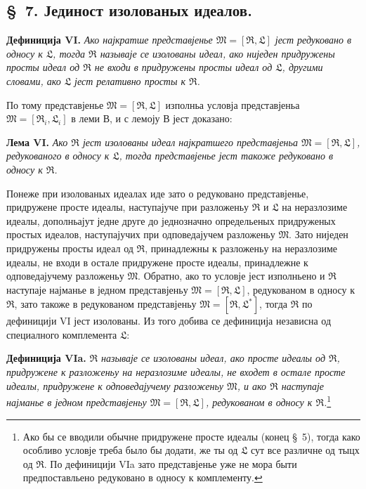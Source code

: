 ﻿\documentclass[11pt]{article}
\newcommand{\ideal}[1]{\mathfrak{#1}}
\begin{document}

\setcounter{footnote}{28}
\subsection*{\S~7. Јединост изолованых идеалов.}

\textbf{Дефиниција VI.} \emph{Ако најкратше представјенье \(\ideal M=[\ideal R,\ideal L]\) јест редуковано в односу к \(\ideal L\), тогда \(\ideal R\) называје се изолованы идеал, ако ниједен придружены просты идеал од \(\ideal R\) не входи в придружены просты идеал од \(\ideal L\), другими словами, ако \(\ideal L\) јест релативно просты к \(\ideal R\).}

По тому представјенье \(\ideal M=[\ideal R,\ideal L]\) изполньа условја представјеньа \(\ideal M=[\ideal R_i,\ideal L_i]\) в леми В, и с лемоју В јест доказано:

\textbf{Лема VI.} \emph{Ако \(\ideal R\) јест изолованы идеал најкратшего представјеньа \(\ideal M=[\ideal R,\ideal L]\), редукованого в односу к \(\ideal L\), тогда представјенье јест такоже редуковано в односу к \(\ideal R\).}

Понеже при изолованых идеалах иде зато о редуковано представјенье, придружене просте идеалы, наступајуче при разложеньу \(\ideal R\) и \(\ideal L\) на неразлозиме идеалы, дополньајут једне друге до једнозначно определьеных придруженых простых идеалов, наступајучих при одповедајучем разложеньу \(\ideal M\). Зато ниједен придружены просты идеал од \(\ideal R\), принадлежны к разложеньу на неразлозиме идеалы, не входи в остале придружене просте идеалы, принадлежне к одповедајучему разложеньу \(\ideal M\). Обратно, ако то условје јест изполньено и \(\ideal R\) наступаје најманье в једном представјеньу \(\ideal M=[\ideal R,\ideal L]\), редукованом в односу к \(\ideal R\), зато такоже в редукованом представјеньу \(\ideal M=[\ideal R,\ideal L^*]\), тогда \(\ideal R\) по дефиницији VI јест изолованы. Из того добива се дефиниција независна од специалного комплемента \(\ideal L\):

\textbf{Дефиниција VIa.} \emph{\(\ideal R\) называје се изолованы идеал, ако просте идеалы од \(\ideal R\), придружене к разложеньу на неразлозиме идеалы, не входет в остале просте идеалы, придружене к одповедајучему разложеньу \(\ideal M\), и ако \(\ideal R\) наступаје најманье в једном представјеньу \(\ideal M=[\ideal R,\ideal L]\), редукованом в односу к \(\ideal R\).}\footnote{Ако бы се вводили обычне придружене просте идеалы (конец \S~5), тогда како особливо условје треба было бы додати, же ты од \(\ideal L\) сут все различне од тыцх од \(\ideal R\). По дефиницији VIa зато представјенье уже не мора быти предпоставльено редуковано в односу к комплементу.}
\end{document}
